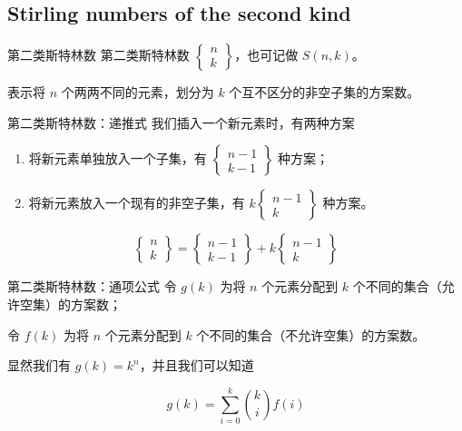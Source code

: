 \documentclass[12pt,aspectratio=169,handout]{beamer}
\begin{document}
\subsection[第二类斯特林数]{Stirling numbers of the second kind}

\begin{frame}[fragile]{第二类斯特林数}
第二类斯特林数 $\begin{Bmatrix}n\\ k\end{Bmatrix}$，也可记做 $S(n, k)$。

表示将 $n$ 个两两不同的元素，划分为 $k$ 个互不区分的非空子集的方案数。
\end{frame}

\begin{frame}[fragile]{第二类斯特林数：递推式}
我们插入一个新元素时，有两种方案

\begin{enumerate}
  \item 将新元素单独放入一个子集，有 $\begin{Bmatrix}n-1\\ k-1\end{Bmatrix}$ 种方案；
  \item 将新元素放入一个现有的非空子集，有 $k\begin{Bmatrix}n-1\\ k\end{Bmatrix}$ 种方案。
\end{enumerate}

$$
\begin{Bmatrix}n\\ k\end{Bmatrix} = \begin{Bmatrix}n-1\\ k-1\end{Bmatrix} + k\begin{Bmatrix}n-1\\ k\end{Bmatrix}
$$
\end{frame}

\begin{frame}[fragile]{第二类斯特林数：通项公式}
令 $g(k)$ 为将 $n$ 个元素分配到 $k$ 个不同的集合（允许空集）的方案数；

令 $f(k)$ 为将 $n$ 个元素分配到 $k$ 个不同的集合（不允许空集）的方案数。

显然我们有 $g(k) = k^n$，并且我们可以知道

$$
g(k) = \sum_{i=0}^{k} {k \choose i} f(i)
$$
\end{frame}
\end{document}
